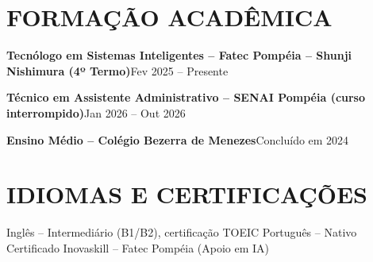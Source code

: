 \documentclass[9pt,a4paper]{extarticle}
\newcommand{\entry}[2]{\vspace{2pt}\noindent\textbf{#1}\hfill{\color{gray}#2}\par}
\begin{document}
\section*{FORMAÇÃO ACADÊMICA}
\entry{Tecnólogo em Sistemas Inteligentes – Fatec Pompéia – Shunji Nishimura (4º Termo)}{Fev 2025 – Presente}
\entry{Técnico em Assistente Administrativo – SENAI Pompéia (curso interrompido)}{Jan 2026 – Out 2026}
\entry{Ensino Médio – Colégio Bezerra de Menezes}{Concluído em 2024}

\section*{IDIOMAS E CERTIFICAÇÕES}
Inglês – Intermediário (B1/B2), certificação TOEIC \textperiodcentered{} Português – Nativo \textperiodcentered{} Certificado Inovaskill – Fatec Pompéia (Apoio em IA)
\end{document}

